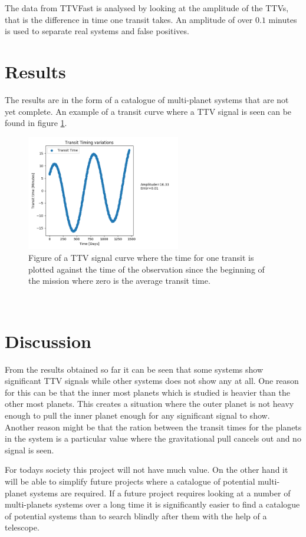 \documentclass[titlepage]{article}
\begin{document}
	The data from TTVFast is analysed by looking at the amplitude of the TTVs, that is the difference in time one transit takes. An amplitude of over $0.1$ minutes is used to separate real systems and false positives.
\section{Results}
	The results are in the form of a catalogue of multi-planet systems that are not yet complete. An example of a transit curve where a TTV signal is seen can be found in figure \ref{fig:TTV}.
	
	\begin{figure}[h!]
		\centering
		\captionsetup{justification=centering}
		\includegraphics[width=0.6\textwidth]{K00221.png}
		\caption{Figure of a TTV signal curve where the time for one transit is plotted against the time of the observation since the beginning of the mission where zero is the average transit time.}
		\label{fig:TTV}
	\end{figure}\
\section{Discussion}
	From the results obtained so far it can be seen that some systems show significant TTV signals while other systems does not show any at all. One reason for this can be that the inner most planets which is studied is heavier than the other most planets. This creates a situation where the outer planet is not heavy enough to pull the inner planet enough for any significant signal to show. Another reason might be that the ration between the transit times for the planets in the system is a particular value where the gravitational pull cancels out and no signal is seen.
	
	
	For todays society this project will not have much value. On the other hand it will be able to simplify future projects where a catalogue of potential multi-planet systems are required. If a future project requires looking at a number of multi-planets systems over a long time it is significantly easier to find a catalogue of potential systems than to search blindly after them with the help of a telescope.
	
\end{document}
